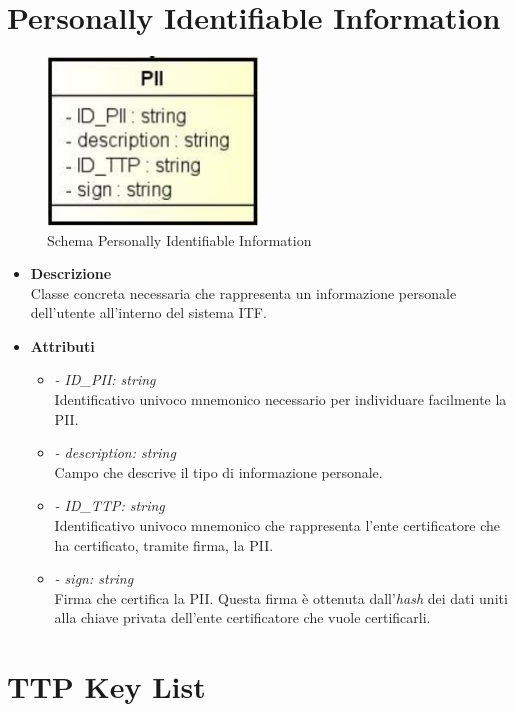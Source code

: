 \section{Personally Identifiable Information}
\begin{figure}[!h]
	\centering
	\includegraphics[width=0.5\textwidth]{immagini/pii}
	\caption{Schema Personally Identifiable Information}
\end{figure}
\begin{itemize}
	\item \textbf{Descrizione}\\
	Classe concreta necessaria che rappresenta un informazione personale dell'utente all'interno del sistema \gls{ITF}.
	\item \textbf{Attributi}\\
	\begin{itemize}
		\item \textit{- ID\_PII: string}\\
		Identificativo univoco mnemonico necessario per individuare facilmente la \gls{PII}.
		\item \textit{- description: string}\\
		Campo che descrive il tipo di informazione personale.
		\item \textit{- ID\_TTP: string}\\
		Identificativo univoco mnemonico che rappresenta l'ente certificatore che ha certificato, tramite firma, la \gls{PII}.
		\item \textit{- sign: string}\\
		Firma che certifica la \gls{PII}. Questa firma è ottenuta dall'\textit{hash} dei dati uniti alla chiave privata dell'ente certificatore che vuole certificarli.
	\end{itemize}
\end{itemize}
\section{TTP Key List}
